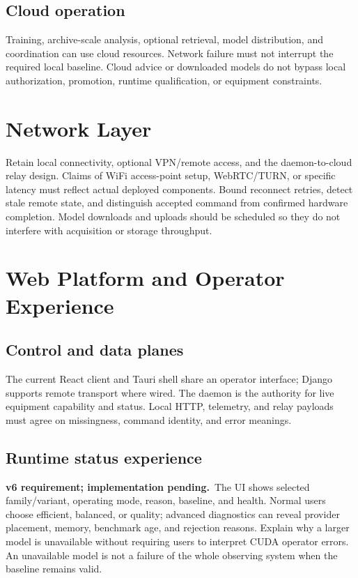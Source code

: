 \documentclass[11pt,a4paper]{article}
\newcommand{\planned}{\textbf{v6 requirement; implementation pending.}\ }
\begin{document}
\subsection{Cloud operation}
Training, archive-scale analysis, optional retrieval, model distribution, and
coordination can use cloud resources. Network failure must not interrupt the
required local baseline. Cloud advice or downloaded models do not bypass local
authorization, promotion, runtime qualification, or equipment constraints.

\section{Network Layer}
Retain local connectivity, optional VPN/remote access, and the daemon-to-cloud
relay design. Claims of WiFi access-point setup, WebRTC/TURN, or specific
latency must reflect actual deployed components. Bound reconnect retries,
detect stale remote state, and distinguish accepted command from confirmed
hardware completion. Model downloads and uploads should be scheduled so they
do not interfere with acquisition or storage throughput.

\section{Web Platform and Operator Experience}
\subsection{Control and data planes}
The current React client and Tauri shell share an operator interface; Django
supports remote transport where wired. The daemon is the authority for live
equipment capability and status. Local HTTP, telemetry, and relay payloads must
agree on missingness, command identity, and error meanings.

\subsection{Runtime status experience}
\planned The UI shows selected family/variant, operating mode, reason,
baseline, and health. Normal users choose efficient, balanced, or quality;
advanced diagnostics can reveal provider placement, memory, benchmark age,
and rejection reasons. Explain why a larger model is unavailable without
requiring users to interpret CUDA operator errors. An unavailable model is
not a failure of the whole observing system when the baseline remains valid.
\end{document}
